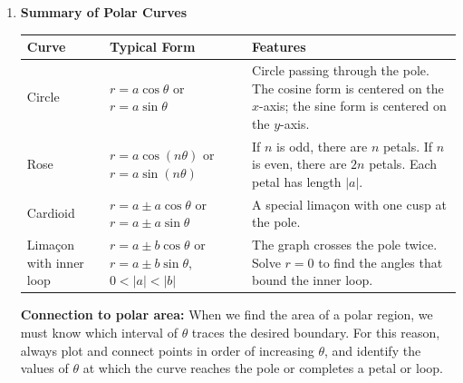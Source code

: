 \documentclass[11pt,letterpaper]{article}
\begin{document}
\begin{enumerate}
\item \textbf{Summary of Polar Curves}

\begin{center}
\renewcommand{\arraystretch}{1.45}
\begin{tabular}{|>{\raggedright\arraybackslash}p{1.15in}|>{\centering\arraybackslash}p{2.75in}|>{\raggedright\arraybackslash}p{2.75in}|}
\hline
\textbf{Curve} & \textbf{Typical Form} & \textbf{Features} \\ \hline
Circle & $r=a\cos\theta$ or $r=a\sin\theta$ & Circle passing through the pole. The cosine form is centered on the $x$-axis; the sine form is centered on the $y$-axis. \\ \hline
Rose & $r=a\cos(n\theta)$ or $r=a\sin(n\theta)$ & If $n$ is odd, there are $n$ petals. If $n$ is even, there are $2n$ petals. Each petal has length $|a|$. \\ \hline
Cardioid & $r=a\pm a\cos\theta$ or $r=a\pm a\sin\theta$ & A special lima\c{c}on with one cusp at the pole. \\ \hline
Lima\c{c}on with inner loop & $r=a\pm b\cos\theta$ or $r=a\pm b\sin\theta$, $0<|a|<|b|$ & The graph crosses the pole twice. Solve $r=0$ to find the angles that bound the inner loop. \\ \hline
\end{tabular}
\end{center}

\begin{notebox}
\textbf{Connection to polar area:} When we find the area of a polar region, we must know which interval of $\theta$ traces the desired boundary. For this reason, always plot and connect points in order of increasing $\theta$, and identify the values of $\theta$ at which the curve reaches the pole or completes a petal or loop.
\end{notebox}

\end{enumerate}
\end{document}
